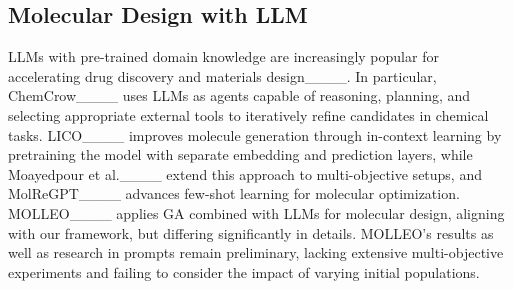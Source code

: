 \subsection{Molecular Design with LLM}
LLMs with pre-trained domain knowledge are increasingly popular for accelerating drug discovery and materials design____. In particular, ChemCrow____ uses LLMs as agents capable of reasoning, planning, and selecting appropriate external tools to iteratively refine candidates in chemical tasks. LICO____ improves molecule generation through in-context learning by pretraining the model with separate embedding and prediction layers, while Moayedpour et al.____ extend this approach to multi-objective setups, and MolReGPT____ advances few-shot learning for molecular optimization. MOLLEO____ applies GA combined with LLMs for molecular design, aligning with our framework, but differing significantly in details. MOLLEO's results as well as research in prompts remain preliminary, lacking extensive multi-objective experiments and failing to consider the impact of varying initial populations.